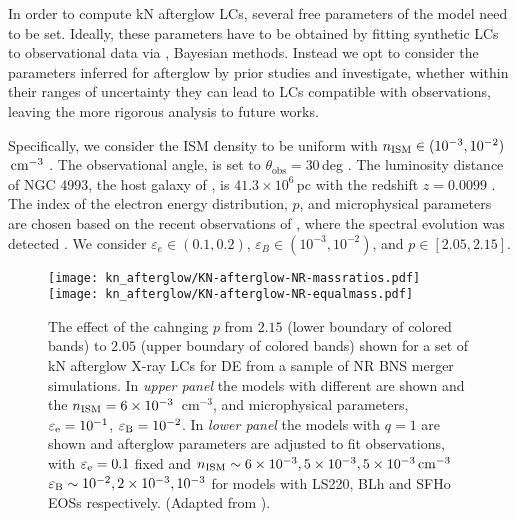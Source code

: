 In order to compute \ac{kN} afterglow \acp{LC}, 
several free parameters of the model need to be set. 
Ideally, these parameters have to be obtained by fitting synthetic \acp{LC} to  
observational data via \eg{}, Bayesian methods. Instead we opt to consider the 
parameters inferred for \GRB{} afterglow by prior studies and investigate, whether 
within their ranges of uncertainty they can lead to \acp{LC} compatible with observations, 
leaving the more rigorous analysis to future works.

Specifically, we consider the \ac{ISM} density to be uniform with 
$n_{\text{ISM}}\in(10^{-3}, 10^{-2})$ $\,\text{cm}^{-3}$ \citep{Hajela:2019mjy}. 
The observational angle, 
is set to $\theta_{\text{obs}}=30\,$deg \citep{TheLIGOScientific:2017qsa}.
The luminosity distance of NGC 4993, the host galaxy of \GW{}, is $41.3\times10^{6}\,$pc 
with the redshift $z=0.0099$ \citep{Hjorth:2017yza}.
%
The index of the electron energy distribution, $p$, and microphysical parameters are 
chosen based on the recent observations of \GRB{}, where the spectral evolution 
was detected \citep{Hajela:2021faz}.  
%
We consider 
$\varepsilon_e\in(0.1, 0.2)$,
$\varepsilon_B\in(10^{-3}, 10^{-2})$, and 
$p\in[2.05,2.15]$.


\begin{figure}
    \begin{center}
        \texttt{[image: kn\_afterglow/KN-afterglow-NR-massratios.pdf]}
        \hspace{-5mm}
        \texttt{[image: kn\_afterglow/KN-afterglow-NR-equalmass.pdf]}
        \caption{
            The effect of the cahnging $p$ from $2.15$ (lower boundary of colored bands) to 
            $2.05$ (upper boundary of colored bands) shown for a set of \ac{kN} afterglow 
            X-ray \acp{LC} for \ac{DE} from a sample of \ac{NR} \ac{BNS} merger simulations.
            In \emph{upper panel} the models with different \mr{} are shown and the 
            $n_{\text{ISM}}=6\times10^{-3}$~cm$^{-3}$, and microphysical parameters, 
            $\varepsilon_{\rm e}=10^{-1}$, $\varepsilon_{\rm B}=10^{-2}$.
            In \emph{lower panel} the models with $q=1$ are shown and afterglow
            parameters are adjusted to fit observations, 
            with $\varepsilon_{\rm e}=0.1$ fixed and  
            $n_{\text{ISM}}\sim 6\times 10^{-3}, 5\times 10^{-3},5\times 10^{-3}\,\rm{cm^{-3}}$
            $\varepsilon_{\rm B}\sim 10^{-2},2\times 10^{-3},10^{-3}$ for models with 
            LS220, BLh and SFHo \acp{EOS} respectively.
            (Adapted from \citet{Hajela:2021faz}).
        } \label{fig:kn_afterglow}
    \end{center}
\end{figure}

